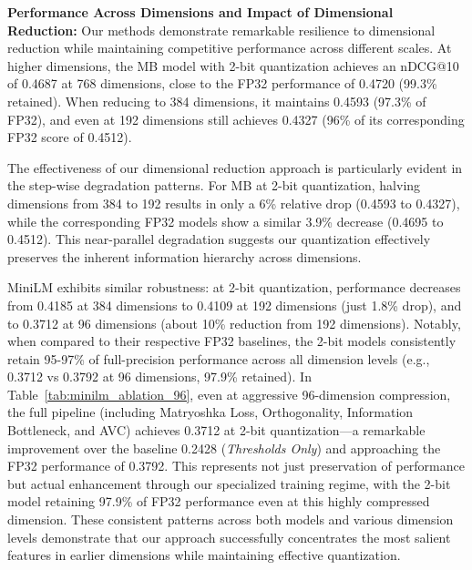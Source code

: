 \textbf{Performance Across Dimensions and Impact of Dimensional Reduction:}
Our methods demonstrate remarkable resilience to dimensional reduction while maintaining competitive performance across different scales. 
At higher dimensions, the MB model with 2-bit quantization achieves an nDCG@10 of 0.4687 at 768 dimensions, close to the FP32 performance of 0.4720 (99.3\% retained). 
When reducing to 384 dimensions, it maintains 0.4593 (97.3\% of FP32), and even at 192 dimensions still achieves 0.4327 (96\% of its corresponding FP32 score of 0.4512).

The effectiveness of our dimensional reduction approach is particularly evident in the step-wise degradation patterns. 
For MB at 2-bit quantization, halving dimensions from 384 to 192 results in only a 6\% relative drop (0.4593 to 0.4327), while the corresponding FP32 models show a similar 3.9\% decrease (0.4695 to 0.4512). 
This near-parallel degradation suggests our quantization effectively preserves the inherent information hierarchy across dimensions.

MiniLM exhibits similar robustness: at 2-bit quantization, performance decreases from 0.4185 at 384 dimensions to 0.4109 at 192 dimensions (just 1.8\% drop), and to 0.3712 at 96 dimensions (about 10\% reduction from 192 dimensions). 
Notably, when compared to their respective FP32 baselines, the 2-bit models consistently retain 95-97\% of full-precision performance across all dimension levels (e.g., 0.3712 vs 0.3792 at 96 dimensions, 97.9\% retained).
In Table~\ref{tab:minilm_ablation_96}, even at aggressive 96-dimension compression, the full pipeline (including Matryoshka Loss, Orthogonality, Information Bottleneck, and AVC) achieves 0.3712 at 2-bit quantization—a remarkable improvement over the baseline 0.2428 (\textit{Thresholds Only}) and approaching the FP32 performance of 0.3792. 
This represents not just preservation of performance but actual enhancement through our specialized training regime, with the 2-bit model retaining 97.9\% of FP32 performance even at this highly compressed dimension.
These consistent patterns across both models and various dimension levels demonstrate that our approach successfully concentrates the most salient features in earlier dimensions while maintaining effective quantization. 


